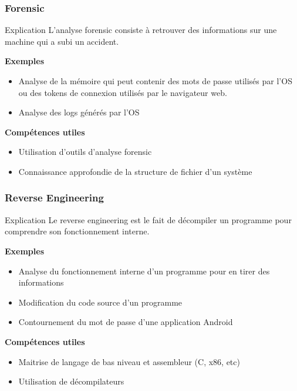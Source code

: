 \documentclass{beamer}
\begin{document}

\begin{frame}
\frametitle{Forensic}

\begin{block}{Explication}
    L'analyse forensic consiste à retrouver des informations sur une machine qui a subi un accident. 
\end{block}

\pause

\textbf{Exemples}
\begin{itemize}
    \item Analyse de la mémoire qui peut contenir des mots de passe utilisés par l'OS ou des tokens de connexion utilisés par le navigateur web.
    \item Analyse des logs générés par l'OS
\end{itemize}

\pause

\textbf{Compétences utiles}
\begin{itemize}
    \item Utilisation d'outils d'analyse forensic
    \item Connaissance approfondie de la structure de fichier d'un système
\end{itemize}


\end{frame}


\begin{frame}
\frametitle{Reverse Engineering}

\begin{block}{Explication}
    Le reverse engineering est le fait de décompiler un programme pour comprendre son fonctionnement interne.
\end{block}

\pause

\textbf{Exemples}
\begin{itemize}
    \item Analyse du fonctionnement interne d'un programme pour en tirer des informations
    \item Modification du code source d'un programme
    \item Contournement du mot de passe d'une application Android
\end{itemize}

\pause

\textbf{Compétences utiles}
\begin{itemize}
    \item Maitrise de langage de bas niveau et assembleur  (C, x86, etc)
    \item Utilisation de décompilateurs
\end{itemize}


\end{frame}
\end{document}
